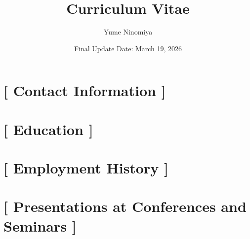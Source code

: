 \documentclass[dvipdfmx,a4paper]{jsarticle}
\title{Curriculum Vitae}
\author{Yume Ninomiya}
\date{Final Update Date: March 19, 2026}
\begin{document}
\maketitle

\section*{\textbf{[ }Contact Information\textbf{ ]}}



\section*{\textbf{[ }Education\textbf{ ]}}

\section*{\textbf{[ }Employment History\textbf{ ]}}


\section*{\textbf{[ }Presentations at Conferences and Seminars\textbf{ ]}}


\end{document}
